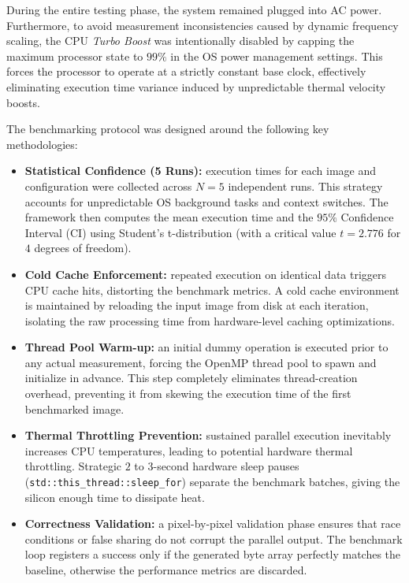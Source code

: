 \documentclass[10pt,twocolumn,letterpaper]{article}
\begin{document}
During the entire testing phase, the system remained plugged into AC power. Furthermore, to avoid measurement inconsistencies caused by dynamic frequency scaling, the CPU \textit{Turbo Boost} was intentionally disabled by capping the maximum processor state to $99\%$ in the OS power management settings. This forces the processor to operate at a strictly constant base clock, effectively eliminating execution time variance induced by unpredictable thermal velocity boosts.

The benchmarking protocol was designed around the following key methodologies:

\begin{itemize}
    \item \textbf{Statistical Confidence (5 Runs):} execution times for each image and configuration were collected across $N=5$ independent runs. This strategy accounts for unpredictable OS background tasks and context switches. The framework then computes the mean execution time and the $95\%$ Confidence Interval (CI) using Student's t-distribution (with a critical value $t = 2.776$ for $4$ degrees of freedom).
    
    \item \textbf{Cold Cache Enforcement:} repeated execution on identical data triggers CPU cache hits, distorting the benchmark metrics. A cold cache environment is maintained by reloading the input image from disk at each iteration, isolating the raw processing time from hardware-level caching optimizations.
    
    \item \textbf{Thread Pool Warm-up:} an initial dummy operation is executed prior to any actual measurement, forcing the OpenMP thread pool to spawn and initialize in advance. This step completely eliminates thread-creation overhead, preventing it from skewing the execution time of the first benchmarked image.
    
    \item \textbf{Thermal Throttling Prevention:} sustained parallel execution inevitably increases CPU temperatures, leading to potential hardware thermal throttling. Strategic $2$ to $3$-second hardware sleep pauses (\lstinline|std::this_thread::sleep_for|) separate the benchmark batches, giving the silicon enough time to dissipate heat.
    
    \item \textbf{Correctness Validation:} a pixel-by-pixel validation phase ensures that race conditions or false sharing do not corrupt the parallel output. The benchmark loop registers a success only if the generated byte array perfectly matches the baseline, otherwise the performance metrics are discarded.
\end{itemize}
\end{document}
